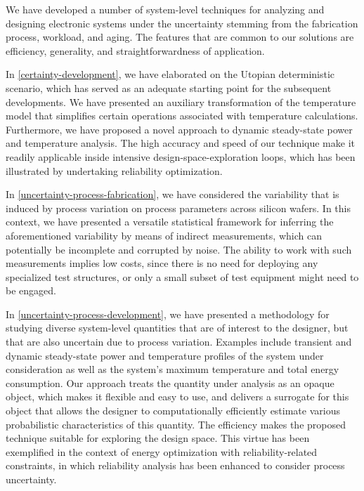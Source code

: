 We have developed a number of system-level techniques for analyzing and
designing electronic systems under the uncertainty stemming from the fabrication
process, workload, and aging. The features that are common to our solutions are
efficiency, generality, and straightforwardness of application.

In \cref{certainty-development}, we have elaborated on the Utopian deterministic
scenario, which has served as an adequate starting point for the subsequent
developments. We have presented an auxiliary transformation of the temperature
model that simplifies certain operations associated with temperature
calculations. Furthermore, we have proposed a novel approach to dynamic
steady-state power and temperature analysis. The high accuracy and speed of our
technique make it readily applicable inside intensive design-space-exploration
loops, which has been illustrated by undertaking reliability optimization.

In \cref{uncertainty-process-fabrication}, we have considered the variability
that is induced by process variation on process parameters across silicon
wafers. In this context, we have presented a versatile statistical framework for
inferring the aforementioned variability by means of indirect measurements,
which can potentially be incomplete and corrupted by noise. The ability to work
with such measurements implies low costs, since there is no need for deploying
any specialized test structures, or only a small subset of test equipment might
need to be engaged.

In \cref{uncertainty-process-development}, we have presented a methodology for
studying diverse system-level quantities that are of interest to the designer,
but that are also uncertain due to process variation. Examples include transient
and dynamic steady-state power and temperature profiles of the system under
consideration as well as the system's maximum temperature and total energy
consumption. Our approach treats the quantity under analysis as an opaque
object, which makes it flexible and easy to use, and delivers a surrogate for
this object that allows the designer to computationally efficiently estimate
various probabilistic characteristics of this quantity. The efficiency makes the
proposed technique suitable for exploring the design space. This virtue has been
exemplified in the context of energy optimization with reliability-related
constraints, in which reliability analysis has been enhanced to consider process
uncertainty.

